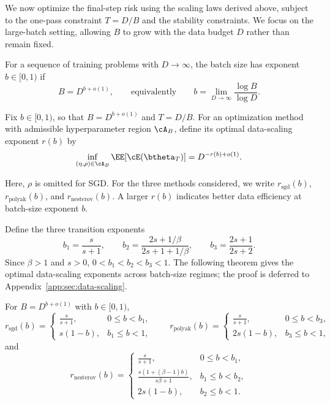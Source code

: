 \documentclass[11pt]{article}
\newcommand{\sgd}{\mathrm{sgd}}
\newcommand{\polyak}{\mathrm{polyak}}
\newcommand{\nesterov}{\mathrm{nesterov}}
\begin{document}
We now optimize the final-step risk using the scaling laws derived above, subject to the one-pass constraint $T=D/B$ and the stability constraints. We focus on the large-batch setting, allowing $B$ to grow with the data budget $D$ rather than remain fixed.
\begin{definition}
\label{def:batch-size-exponent}
For a sequence of training problems with \(D\to\infty\), the batch size has exponent \(b\in[0,1)\) if
\[
B=D^{b+o(1)},
\qquad\text{equivalently}\qquad
b=\lim_{D\to\infty}\frac{\log B}{\log D}.
\]
\end{definition}

\begin{definition}
\label{def:batch-scaling-exponent}
Fix \(b\in[0,1)\), so that \(B=D^{b+o(1)}\) and \(T=D/B\). For an optimization method with admissible hyperparameter region \(\cA_B\), define its optimal data-scaling exponent \(r(b)\) by
\[
\inf_{(\eta,\rho)\in\cA_B}\EE[\cE(\btheta_T)]
=
D^{-r(b)+o(1)}.
\]
\end{definition}
Here, \(\rho\) is omitted for SGD. For the three methods considered, we write \(r_{\sgd}(b)\), \(r_{\polyak}(b)\), and \(r_{\nesterov}(b)\). A larger \(r(b)\) indicates better data efficiency at batch-size exponent \(b\).

Define the three transition exponents
\begin{equation}
b_1=\frac{s}{s+1},\qquad
b_2=\frac{2s+1/\beta}{2s+1+1/\beta},\qquad
b_3=\frac{2s+1}{2s+2}.
\end{equation}
Since \(\beta>1\) and \(s>0\), \(0<b_1<b_2<b_3<1\). The following theorem gives the optimal data-scaling exponents across batch-size regimes; the proof is deferred to Appendix~\ref{app:sec:data-scaling}.

\begin{highlightedtheorem}
\begin{theorem}
\label{thm:batch-size-scaling}
For \(B=D^{b+o(1)}\) with \(b\in[0,1)\), 
\[
r_{\sgd}(b)=
\begin{cases}
\frac{s}{s+1}, & 0\leq b<b_1,\\[2mm]
s(1-b), & b_1\leq b<1,
\end{cases}
\qquad
r_{\polyak}(b)=
\begin{cases}
\frac{s}{s+1}, & 0\leq b<b_3,\\[2mm]
2s(1-b), & b_3\leq b<1,
\end{cases}
\]
and
\[
r_{\nesterov}(b)=
\begin{cases}
\frac{s}{s+1}, & 0\leq b<b_1,\\[2mm]
\frac{s(1+(\beta-1)b)}{s\beta+1}, & b_1\leq b<b_2,\\[3mm]
2s(1-b), & b_2\leq b<1.
\end{cases}
\]
\end{theorem}
\end{highlightedtheorem}
\end{document}
